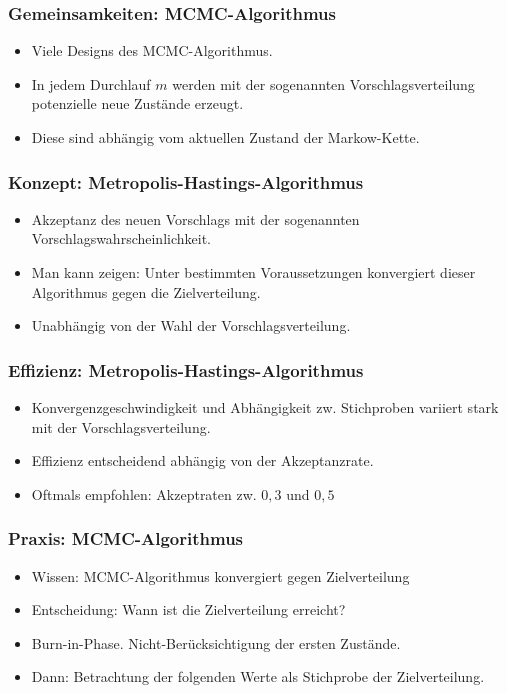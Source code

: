 \documentclass[aspectratio=169,xcolor=dvipsnames]{beamer}
\begin{document}
\begin{frame}
\frametitle{Gemeinsamkeiten: MCMC-Algorithmus}
\begin{itemize}
	\item<1-> Viele Designs des MCMC-Algorithmus.
	\item<2-> In jedem Durchlauf $m$ werden mit der sogenannten Vorschlagsverteilung potenzielle neue Zustände erzeugt.
	\item<3-> Diese sind abhängig vom aktuellen Zustand der Markow-Kette.
\end{itemize}
\end{frame}

\begin{frame}
\frametitle{Konzept: Metropolis-Hastings-Algorithmus}
\begin{itemize}
	\item<1-> Akzeptanz des neuen Vorschlags mit der sogenannten Vorschlagswahrscheinlichkeit.
	\item<2-> Man kann zeigen: Unter bestimmten Voraussetzungen konvergiert dieser Algorithmus gegen die Zielverteilung.
	\item<3-> Unabhängig von der Wahl der Vorschlagsverteilung.
\end{itemize}
\end{frame}

\begin{frame}
\frametitle{Effizienz: Metropolis-Hastings-Algorithmus}
\begin{itemize}
	\item<1-> Konvergenzgeschwindigkeit und Abhängigkeit zw. Stichproben variiert stark mit der Vorschlagsverteilung.
	\item<2-> Effizienz entscheidend abhängig von der Akzeptanzrate.
	\item<3-> Oftmals empfohlen: Akzeptraten zw. $0,3$ und $0,5$
\end{itemize}
\end{frame}

\begin{frame}
\frametitle{Praxis: MCMC-Algorithmus}
\begin{itemize}
	\item<1-> Wissen: MCMC-Algorithmus konvergiert gegen Zielverteilung
	\item<2-> Entscheidung: Wann ist die Zielverteilung erreicht?
	\item<3-> Burn-in-Phase. Nicht-Berücksichtigung der ersten Zustände.
	\item<4-> Dann: Betrachtung der folgenden Werte als Stichprobe der Zielverteilung.
\end{itemize}
\end{frame}
\end{document}
